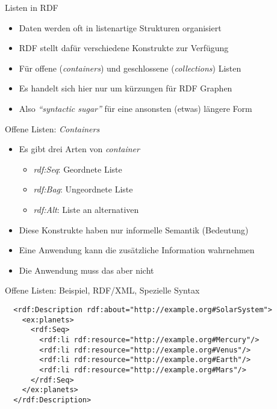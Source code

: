 \documentclass{beamer}
\begin{document}
\begin{frame}{Listen in RDF}
	
	\begin{itemize}
		\item Daten werden oft in listenartige Strukturen organisiert
		\item RDF stellt dafür verschiedene Konstrukte zur Verfügung
		\item Für offene (\emph{containers}) und geschlossene (\emph{collections}) Listen
		\item Es handelt sich hier nur um kürzungen für RDF Graphen
		\item Also \emph{``syntactic sugar''} für eine ansonsten (etwas) längere Form
	\end{itemize}
	
\end{frame}

\begin{frame}{Offene Listen: \emph{Containers}}
	
	\begin{itemize}
		\item Es gibt drei Arten von \emph{container}
		\begin{itemize}
			\item \emph{rdf:Seq}: Geordnete Liste
			\item \emph{rdf:Bag}: Ungeordnete Liste
			\item \emph{rdf:Alt}: Liste an alternativen
		\end{itemize}
		\item Diese Konstrukte haben nur informelle Semantik (Bedeutung)
 		\item Eine Anwendung kann die zusätzliche Information wahrnehmen
 		\item Die Anwendung muss das aber nicht
	\end{itemize}
	
\end{frame}

\begin{frame}[fragile]{Offene Listen: Beispiel, RDF/XML, Spezielle Syntax}
	
	\small
	\begin{lstlisting}	
  <rdf:Description rdf:about="http://example.org#SolarSystem">
    <ex:planets>
      <rdf:Seq>
        <rdf:li rdf:resource="http://example.org#Mercury"/>
        <rdf:li rdf:resource="http://example.org#Venus"/>
        <rdf:li rdf:resource="http://example.org#Earth"/>
        <rdf:li rdf:resource="http://example.org#Mars"/>
      </rdf:Seq>
    </ex:planets>
  </rdf:Description>
	\end{lstlisting}
	
\end{frame}
\end{document}
